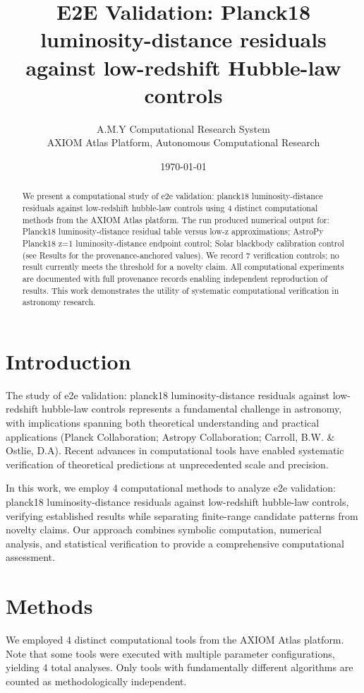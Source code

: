 \documentclass[11pt,a4paper]{article}
\title{E2E Validation: Planck18 luminosity-distance residuals against low-redshift Hubble-law controls}
\author{A.M.Y Computational Research System\\
\small AXIOM Atlas Platform, Autonomous Computational Research}
\date{\today}
\begin{document}
\maketitle

\begin{abstract}
We present a computational study of e2e validation: planck18 luminosity-distance residuals against low-redshift hubble-law controls using 4 distinct computational methods from the AXIOM Atlas platform. The run produced numerical output for: Planck18 luminosity-distance residual table versus low-z approximations; AstroPy Planck18 z=1 luminosity-distance endpoint control; Solar blackbody calibration control (see Results for the provenance-anchored values). We record 7 verification controls; no result currently meets the threshold for a novelty claim. All computational experiments are documented with full provenance records enabling independent reproduction of results. This work demonstrates the utility of systematic computational verification in astronomy research.
\end{abstract}

\section{Introduction}
The study of e2e validation: planck18 luminosity-distance residuals against low-redshift hubble-law controls represents a fundamental challenge in astronomy, with implications spanning both theoretical understanding and practical applications (Planck Collaboration; Astropy Collaboration; Carroll, B.W. \& Ostlie, D.A). Recent advances in computational tools have enabled systematic verification of theoretical predictions at unprecedented scale and precision.

In this work, we employ 4 computational methods to analyze e2e validation: planck18 luminosity-distance residuals against low-redshift hubble-law controls, verifying established results while separating finite-range candidate patterns from novelty claims. Our approach combines symbolic computation, numerical analysis, and statistical verification to provide a comprehensive computational assessment.


\section{Methods}
We employed 4 distinct computational tools from the AXIOM Atlas platform. Note that some tools were executed with multiple parameter configurations, yielding 4 total analyses. Only tools with fundamentally different algorithms are counted as methodologically independent.
\end{document}
